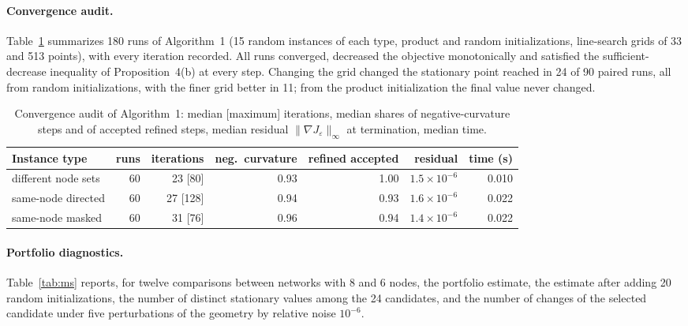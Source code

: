 \documentclass[12pt]{article}
\begin{document}
\paragraph{Convergence audit.} Table~\ref{tab:audit} summarizes 180 runs of Algorithm~1 (15 random instances of each type, product and random initializations, line-search grids of 33 and 513 points), with every iteration recorded. All runs converged, decreased the objective monotonically and satisfied the sufficient-decrease inequality of Proposition~4(b) at every step. Changing the grid changed the stationary point reached in 24 of 90 paired runs, all from random initializations, with the finer grid better in 11; from the product initialization the final value never changed.

\begin{table}[h]
\caption{Convergence audit of Algorithm~1: median [maximum] iterations, median shares of negative-curvature steps and of accepted refined steps, median residual $\|\nabla J_\varepsilon\|_\infty$ at termination, median time.}\label{tab:audit}
\centering\small
\begin{tabular}{lrrrrrr}
\toprule
Instance type & runs & iterations & neg.\ curvature & refined accepted & residual & time (s)\\
\midrule
different node sets & 60 & 23 [80] & 0.93 & 1.00 & $1.5\times10^{-6}$ & 0.010\\
same-node directed & 60 & 27 [128] & 0.94 & 0.93 & $1.6\times10^{-6}$ & 0.022\\
same-node masked & 60 & 31 [76] & 0.96 & 0.94 & $1.4\times10^{-6}$ & 0.022\\
\bottomrule
\end{tabular}

\end{table}

\paragraph{Portfolio diagnostics.} Table~\ref{tab:ms} reports, for twelve comparisons between networks with 8 and 6 nodes, the portfolio estimate, the estimate after adding 20 random initializations, the number of distinct stationary values among the 24 candidates, and the number of changes of the selected candidate under five perturbations of the geometry by relative noise $10^{-6}$.
\end{document}
